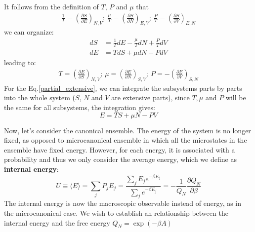 \documentclass{article}
\begin{document}
It follows from the definition of  $T$, $P$ and $\mu$ that 
\begin{gather}
    \frac{1}{T} = \left(\frac{\partial S}{\partial E}\right)_{N,V};\  
    \frac{\mu}{T} = \left(\frac{\partial S}{\partial N}\right)_{E,V};\ 
    \frac{P}{T} = \left(\frac{\partial S}{\partial V}\right)_{E,N}
\end{gather}
we can organize:
\begin{align}
    dS &= \frac{1}{T} dE - \frac{\mu}{T}dN + \frac{P}{T}dV \\
    dE &= TdS + \mu dN - P dV \label{partial_extensive}
\end{align}
leading to:
\begin{align}
    T = \left(\frac{\partial E}{\partial S}\right)_{N,V};\  
    \mu = \left(\frac{\partial E}{\partial N}\right)_{S,V};\ 
    P = -\left(\frac{\partial E}{\partial V}\right)_{S,N}
\end{align}
For the Eq.\ref{partial_extensive}, we can integrate the subsystems parts by parts into 
the whole system ($S$, $N$ and $V$ are extensive parts), 
since $T, \mu$ and $P$ will be the same for all subsystems, the integration
gives:
\begin{equation}
    E = TS + \mu N - PV \label{energy}
\end{equation}

Now, let's consider the canonical ensemble. The energy of the system
is no longer fixed, as opposed to microcanonical ensemble in which all the 
microstates in the ensemble have fixed energy. 
However, for each energy, it is associated with a 
probability and thus we only consider the average energy, which we define
as \textbf{internal energy}:
\begin{equation}
    U \equiv \langle E \rangle = \sum_j P_j E_j = \frac{\sum_j E_j e^{-\beta E_j}}{\sum_j e^{-\beta E_j}} = -\frac{1}{Q_N} \frac{\partial Q_N}{\partial \beta}
\end{equation}
The internal energy is now the macroscopic observable instead of energy, as
in the microcanonical case.
We wish to establish an relationship between the internal energy and 
the free energy $Q_N = \exp(-\beta A)$
\end{document}
